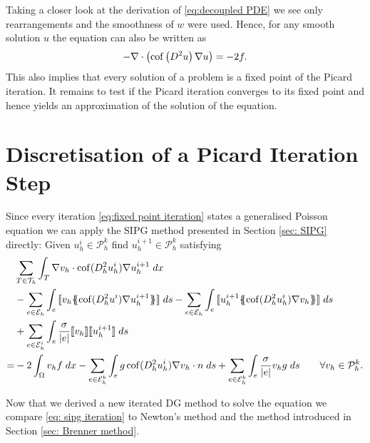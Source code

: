 Taking a closer look at the derivation of \eqref{eq:decoupled PDE} we see only rearrangements and the smoothness of $w$ were used. Hence, for any smooth solution $u$ the \MA equation can also be written as
\begin{align}
- \nabla \cdot \left( \operatorname{cof} \left(  D^2 u \right) \nabla u \right)  = -2f.  \label{eq: analytical fixed point iteration}
\end{align}
This also implies that every solution of a \MA problem is a fixed point of the Picard iteration. It remains to test if the Picard iteration converges to its fixed point and hence yields an approximation of the solution of the \MA equation. 


\section{Discretisation of a Picard Iteration Step}\label{sec: SIPG MA}
Since every iteration \eqref{eq:fixed point iteration} states a generalised Poisson equation we can apply the SIPG method presented in Section \ref{sec: SIPG} directly: Given $u^i_h\in \mathcal P^k_h$ find $u^{i+1}_h \in \mathcal P^k_h$ satisfying
\begin{align}
 &\sum_{T \in \triang} \myIntX {T} {\nabla v_h \cdot \cof(D_h^2 u_h^{i}) \nabla u_h^{i+1}}  \nonumber\\
 & -\sum\limits_{e \in \edges}\myIntS e { \jump {v_h \average { \cof(D_h^2 u^{i}) \nabla u_h^{i+1}} }}
 - \sum\limits_{e \in \edges}\myIntS e { \jump {u_h^{i+1} \average{ \cof(D_h^2 u_h^{i}) \nabla v_h} }} \nonumber\\  
 &  +\sum\limits_{e \in \edgesi} \myIntS e { \frac \sigma {|e|} \jump {v_h}  \jump {u_h^{i+1}}}\nonumber\\
    =& - 2 \myIntX {\Omega} {v_h f}
    	 				-\sum\limits_{e \in \edgesb}\myIntS e {g \cof(D_h^2 u_h^{i}) \nabla v_h \cdot n }
    	 				+\sum\limits_{e \in \edgesb} \myIntS e { \frac \sigma {|e|} v_h g}    \qquad \forall v_h \in  \mathcal P^k_h.
    	\label{eq: sipg iteration}
\end{align}

Now that we derived a new iterated DG method to solve the \MA equation we compare \eqref{eq: sipg iteration} to Newton's method and the method introduced in Section \ref{sec: Brenner method}. 



